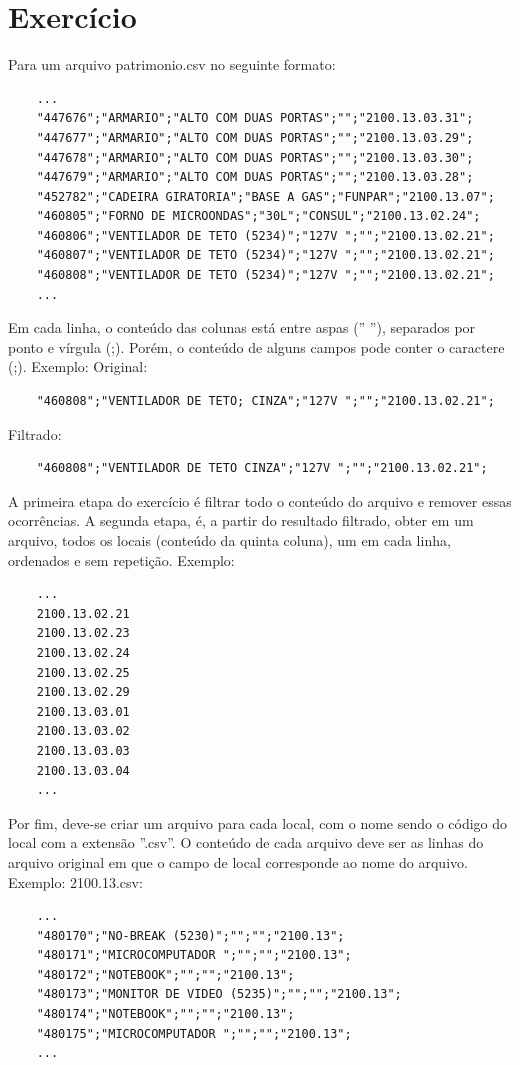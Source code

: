 \documentclass[oneside, 11 pt]{article}
\begin{document}
	\section{Exercício}
	Para um arquivo patrimonio.csv no seguinte formato:
	\begin{lstlisting}
	...
	"447676";"ARMARIO";"ALTO COM DUAS PORTAS";"";"2100.13.03.31";
	"447677";"ARMARIO";"ALTO COM DUAS PORTAS";"";"2100.13.03.29";
	"447678";"ARMARIO";"ALTO COM DUAS PORTAS";"";"2100.13.03.30";
	"447679";"ARMARIO";"ALTO COM DUAS PORTAS";"";"2100.13.03.28";
	"452782";"CADEIRA GIRATORIA";"BASE A GAS";"FUNPAR";"2100.13.07";
	"460805";"FORNO DE MICROONDAS";"30L";"CONSUL";"2100.13.02.24";
	"460806";"VENTILADOR DE TETO (5234)";"127V ";"";"2100.13.02.21";
	"460807";"VENTILADOR DE TETO (5234)";"127V ";"";"2100.13.02.21";
	"460808";"VENTILADOR DE TETO (5234)";"127V ";"";"2100.13.02.21";
	...
	\end{lstlisting}
	
	Em cada linha, o conteúdo das colunas está entre aspas ('' ''), separados por ponto e vírgula (;). Porém, o conteúdo de alguns campos pode conter o caractere (;). Exemplo:
	Original:
	\begin{lstlisting}
	"460808";"VENTILADOR DE TETO; CINZA";"127V ";"";"2100.13.02.21";
	\end{lstlisting}
	Filtrado:
	\begin{lstlisting}
	"460808";"VENTILADOR DE TETO CINZA";"127V ";"";"2100.13.02.21";
	\end{lstlisting}
	A primeira etapa do exercício é filtrar todo o conteúdo do arquivo e remover essas ocorrências. A segunda etapa, é, a partir do resultado filtrado, obter em um arquivo, todos os locais (conteúdo da quinta coluna), um em cada linha, ordenados e sem repetição.
	Exemplo:
	\begin{lstlisting}
	...
	2100.13.02.21
	2100.13.02.23
	2100.13.02.24
	2100.13.02.25
	2100.13.02.29
	2100.13.03.01
	2100.13.03.02
	2100.13.03.03
	2100.13.03.04
	...
	\end{lstlisting}
	Por fim, deve-se criar um arquivo para cada local, com o nome sendo o código do local com a extensão ''.csv''. O conteúdo de cada arquivo deve ser as linhas do arquivo original em que o campo de local corresponde ao nome do arquivo. Exemplo:
	2100.13.csv:
	\begin{lstlisting}
	...
	"480170";"NO-BREAK (5230)";"";"";"2100.13";
	"480171";"MICROCOMPUTADOR ";"";"";"2100.13";
	"480172";"NOTEBOOK";"";"";"2100.13";
	"480173";"MONITOR DE VIDEO (5235)";"";"";"2100.13";
	"480174";"NOTEBOOK";"";"";"2100.13";
	"480175";"MICROCOMPUTADOR ";"";"";"2100.13";
	...
	\end{lstlisting}
	
\end{document}
